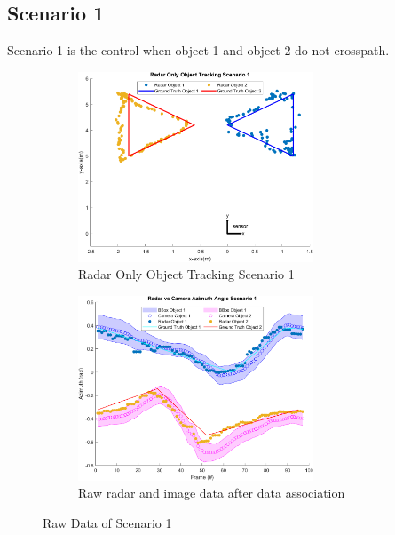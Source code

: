\subsection{Scenario 1}\label{sec:3-exp_result1}
Scenario 1 is the control when object 1 and object 2 do not crosspath.
\href{https://drive.google.com/file/d/1SL30CC6EpyI4NLOcGnfALKAP44P82u9n/view?usp=sharing}{\color{blue}{Video}}
\begin{figure}[!htb]
    \hspace{0.1\textwidth}
    \begin{subfigure}[b]{0.3\textwidth}%
        \includegraphics[width=7cm]{Figures/matlab/Radar Only Object Tracking Scenario 1.png}
        \caption{Radar Only Object Tracking Scenario 1}
        \label{subfig:radar_1}
    \end{subfigure}
    \hspace{0.1\textwidth}
    \begin{subfigure}[b]{0.3\textwidth}%
        \includegraphics[width=7cm]{Figures/matlab/Radar vs Camera Azimuth Angle Scenario 1.png}
        \caption{Raw radar and image data after data association}
        \label{subfig:raw_fusion_1}
    \end{subfigure}

    \caption{Raw Data of Scenario 1}
    \label{fig:raw_1}
\end{figure}
